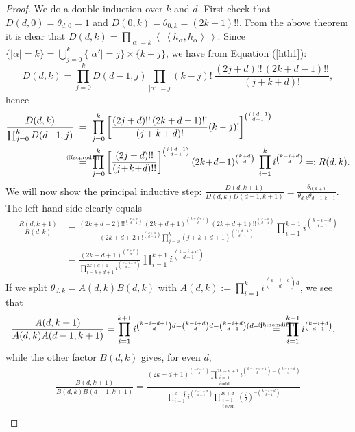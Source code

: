 \documentclass{amsart}
\newcommand{\coloneqq}{:=}
\newcommand{\bra}{\left<\!\!\!\:\left<}
\newcommand{\ket}{\right>\!\!\!\:\right>}
\newcommand{\myeq}[1]{\mathrel{\overset{\makebox[0pt]{\text{\tiny #1}}}{=}}}
\theoremstyle{plain}
\theoremstyle{definition}
\theoremstyle{remark}
\begin{document}
\begin{proof} We do a double induction over $k$ and $d$. First check that $D(d,0) = \theta_{d,0}=1$ and $D(0,k) = \theta_{0,k} =(2k-1)!!$.
From the above theorem it is clear that $D(d,k)=\prod_{|\alpha | =k}\bra h_\alpha ,h_\alpha \ket$. Since $\{ |\alpha| = k \} = \bigcup_{j=0}^k  \{ |\alpha'| = j \} \times \{ k-j \}  $, we have from Equation (\ref{hth1}):
$$
D(d,k) = \prod_{j=0}^k D(d\!-\!1,j) \prod_{|\alpha'| = j} (k-j)!\,\frac{(2j+d)!!\,(2k+d-1)!!}{(j+k+d)!},
$$
hence 
\begin{align*}
\frac{D(d,k)}{\prod_{j=0}^k D(d\!-\!1,j) } \;&=\; \prod_{j=0}^k \left[\frac{(2j+d)!!\,(2k+d-1)!!}{(j+k+d)!} (k-j)!\right]^{\binom{j+d-1}{d-1}} \\
&\myeq{(\ref{facprod1})}\; \prod_{j=0}^k\left[ \frac{(2j+d)!!}{(j\!+\!k\!+\!d)!!}\right]^{\binom{j+d-1}{d-1}}(2k\!+\!d\!-\!1)^{\binom{k+d}{d}} \;\prod_{i=1}^k i^{\binom{k-i+d}{d}} =: R(d,k) .
\end{align*}
We will now show the principal inductive step: $\frac{D(d,k+1)}{D(d,k)D(d-1,k+1)}=\frac{\theta_{d,k+1}}{\theta_{d,k}\theta_{d-1,k+1}}$. The left hand side clearly equals
\begin{align*}
 \frac{R(d,k+1)}{R(d,k)} &= \frac{(2k\!+\!d\!+\!2)!!^{\binom{k+d}{d-1}}\,(2k\!+\!d\!+\!1)^{\binom{k+d+1}{d}}\,(2k\!+\!d\!+\!1)!!^{\binom{k+d}{d-1}}}{(2k\!+\!d\!+\!2)!^{\binom{k+d}{d-1}} \prod\limits_{j=0}^k(j\!+\!k\!+\!d\!+\!1)^{\binom{j+d-1}{d-1}}} \prod_{i=1}^{k+1} i^{\binom{k-i+d}{d-1}}\\
&= \frac{(2k+d+1)^{\binom{k+d}{d}}}{\prod\limits_{i=k+d+1}^{2k+d+1}i^{ \binom{k-i+d}{d-1}} }\prod_{i=1}^{k+1} i^{\binom{k-i+d}{d-1}}.
\end{align*}
If we split $\theta_{d,k} = A(d,k)B(d,k)$ with $A(d,k)\coloneqq\prod_{i=1}^k i^{\binom{k-i+d}{d}d}$, we see that
\begin{align*}
\frac{A(d,k+1)}{A(d,k)A(d-1,k+1)} &=
 \prod_{i=1}^{k+1}i^{\binom{k-i+d+1}{d}d-\binom{k-i+d}{d}d -\binom{k-i+d}{d-1}(d-1)} \ 
 \myeq{(\ref{binomdiff})}\ \prod_{i=1}^{k+1} i^{\binom{k-i+d}{d-1}},
\end{align*}
while the other factor $B(d,k)$ gives, for even $d$,
\begin{gather*}
\frac{B(d,k+1)}{B(d,k)B(d-1,k+1)} = \frac{ (2k\!+\!d\!+\!1)^{\binom{-k-1}{d}} \prod\limits_{\substack{i=1 \\ i\ \text{odd} }}^{2k+d+1}i^{\binom{k-i+d+1}{d}-\binom{k-i+d}{d}}  }{\prod\limits_{i=1}^{k+\frac{d}{2}} i^{\binom{k-i+d}{d-1}} \prod\limits_{\substack{i=1 \\ i\ \text{even} }}^{2k+d} \left(\frac{i}{2}\right)^{- \binom{k-i+d}{d-1}} } \\

\end{gather*}
\end{proof}
\end{document}
